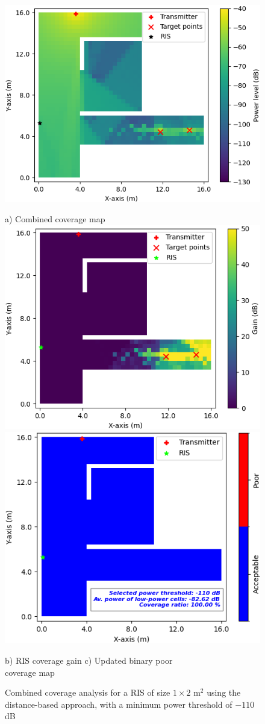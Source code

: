 \documentclass{IEEEoj}
\begin{document}
\begin{figure}
	\centering
	\includegraphics[width=0.8\linewidth]{Sim_Results/Comb_cov_1x2_Distance_-110dB.png}
	
	a) Combined coverage map \\[5pt]
	
	\includegraphics[width=0.49\linewidth]{Sim_Results/RIS_cov_gain_1x2_Distance_-110dB.png}
	\hfill
	\includegraphics[width=0.48\linewidth]{Sim_Results/New_Binary_Cov_Map_1x2_Distance_-110dB.png}
	
	\hspace{10pt} b) RIS coverage gain \hspace{30pt} c) Updated binary poor \\ \hspace{140pt} coverage map
	\caption{Combined coverage analysis for a RIS of size $1 \times 2$ m$^2$ using the distance-based approach, with a minimum power threshold of $-110$ dB}
	\label{comb_cov_distance_-110dB}
\end{figure}
\end{document}
